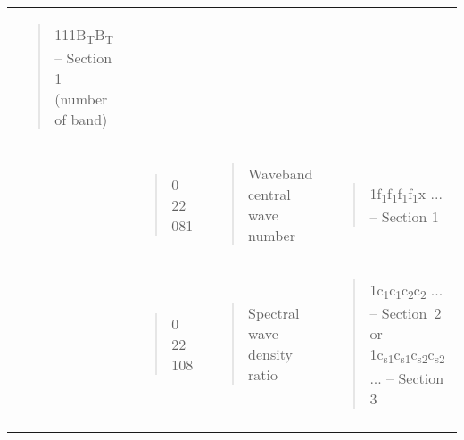 \begin{longtable}[]{@{}llll@{}}
\begin{minipage}[t]{0.22\columnwidth}
\begin{quote}
111B\textsubscript{T}B\textsubscript{T} -- Section 1 (number of band)
\end{quote}\strut
\end{minipage}\tabularnewline
\begin{minipage}[t]{0.22\columnwidth}\raggedright
\strut
\end{minipage} & \begin{minipage}[t]{0.22\columnwidth}\raggedright
\begin{quote}
0 22 081
\end{quote}\strut
\end{minipage} & \begin{minipage}[t]{0.22\columnwidth}\raggedright
\begin{quote}
Waveband central wave number
\end{quote}\strut
\end{minipage} & \begin{minipage}[t]{0.22\columnwidth}\raggedright
\begin{quote}
1f\textsubscript{1}f\textsubscript{1}f\textsubscript{1}f\textsubscript{1}x ... -- Section 1
\end{quote}\strut
\end{minipage}\tabularnewline
\begin{minipage}[t]{0.22\columnwidth}\raggedright
\strut
\end{minipage} & \begin{minipage}[t]{0.22\columnwidth}\raggedright
\begin{quote}
0 22 108
\end{quote}\strut
\end{minipage} & \begin{minipage}[t]{0.22\columnwidth}\raggedright
\begin{quote}
Spectral wave density ratio
\end{quote}\strut
\end{minipage} & \begin{minipage}[t]{0.22\columnwidth}\raggedright
\begin{quote}
1c\textsubscript{1}c\textsubscript{1}c\textsubscript{2}c\textsubscript{2} ... -- Section~2 or 1c\textsubscript{s1}c\textsubscript{s1}c\textsubscript{s2}c\textsubscript{s2} ... -- Section 3
\end{quote}\strut
\end{minipage}\tabularnewline
\begin{minipage}[t]{0.22\columnwidth}\raggedright
\strut
\end{minipage} & \begin{minipage}[t]{0.22\columnwidth}\raggedright

\end{minipage}
\end{longtable}
